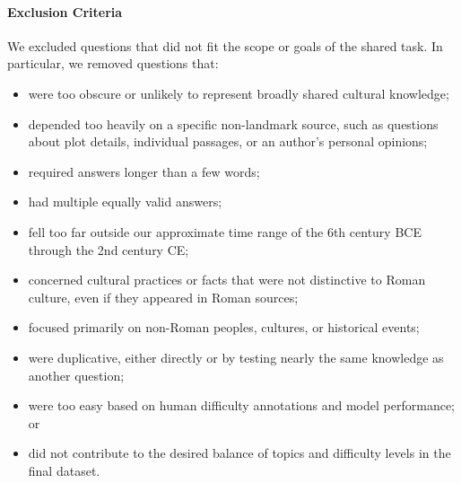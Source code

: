 \documentclass[11pt]{article}
\begin{document}


\paragraph{Exclusion Criteria}

We excluded questions that did not fit the scope or goals of the shared task. In particular, we removed questions that:

\begin{itemize}
\vspace{-2mm}
\item were too obscure or unlikely to represent broadly shared cultural knowledge;
\vspace{-3mm}
\item depended too heavily on a specific non-landmark source, such as questions about plot details, individual passages, or an author's personal opinions;
\vspace{-3mm}
\item required answers longer than a few words;
\vspace{-3mm}
\item had multiple equally valid answers;
\vspace{-3mm}
\item fell too far outside our approximate time range of the 6th century BCE through the 2nd century CE;
\vspace{-3mm}
\item concerned cultural practices or facts that were not distinctive to Roman culture, even if they appeared in Roman sources;
\vspace{-3mm}
\item focused primarily on non-Roman peoples, cultures, or historical events;
\vspace{-3mm}
\item were duplicative, either directly or by testing nearly the same knowledge as another question;
\vspace{-3mm}
\item were too easy based on human difficulty annotations and model performance; or
\vspace{-3mm}
\item did not contribute to the desired balance of topics and difficulty levels in the final dataset.
\end{itemize}
\end{document}
